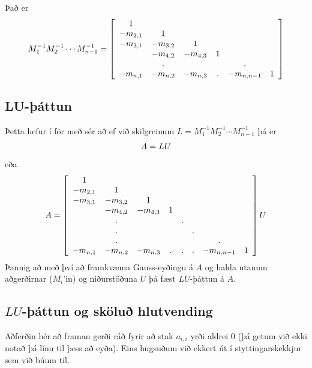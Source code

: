 \documentclass[letterpaper,10pt,icelandic]{sphinxmanual}
\begin{document}
Það er
\begin{gather}
\begin{split}M_1^{-1} M_2^{-1} \cdots M_{n-1}^{-1} = \left[
\begin{array}{cccccc}
1 &   &   &   &   &     \\
-m_{2,1} & 1 &   &   &     &  \\
-m_{3,1} & -m_{3,2} & 1 &    &   &  \\
  & -m_{4,2} & -m_{4,3} & 1   &   &  \\
  & . &   &   & . &    \\
-m_{n,1} & -m_{n,2} & -m_{n,3} & . & -m_{n,n-1}  & 1
   \end{array}
\right]\end{split}\notag
\end{gather}

\subsection{LU-þáttun}
\label{kafli08:index-17}\label{kafli08:id3}
Þetta hefur í för með sér að ef við skilgreinum
\(L = M_1^{-1} M_2^{-1} \cdots M_{n-1}^{-1}\) þá er
\begin{gather}
\begin{split}A = LU\end{split}\notag
\end{gather}
eða
\begin{gather}
\begin{split}A = \left[\begin{array}{cccccccc}
1 &   &   &   &   &   &   &  \\
-m_{2,1} & 1 &   &   &   &   &   &  \\
-m_{3,1} & -m_{3,2} & 1 &   &   &   &   &  \\
  & -m_{4,2} & -m_{4,3} & 1 &   &   &   &  \\
  & . &   &   & . &   &   &  \\
  & . &   &   &   & . &   &  \\
  & . &   &   &   &   & . &  \\
-m_{n,1} & -m_{n,2} & -m_{n,3} & . & . & . & -m_{n,n-1} & 1
   \end{array}\right] U\end{split}\notag
\end{gather}
Þannig að með því að framkvæma Gauss-eyðingu á \(A\) og halda
utanum aðgerðirnar (\(M_i\)’in) og niðurstöðuna \(U\) þá fæst
\(LU\)-þáttun á \(A\).


\subsection{\(LU\)-þáttun og sköluð hlutvending}
\label{kafli08:attun-og-skolu-hlutvending}
Aðferðin hér að framan gerði ráð fyrir að stak \(a_{i,i}\) yrði
aldrei 0 (þá getum við ekki notað þá línu til þess að eyða). Eins
hugsuðum við ekkert út í styttingarskekkjur sem við búum til.
\end{document}
